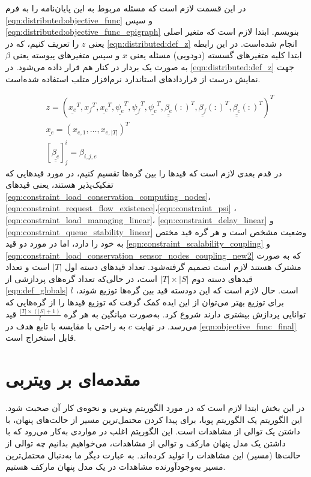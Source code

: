 	در این قسمت لازم است که مسئله مربوط به این پایان‌نامه را به فرم \cref{eqn:distributed:objective_func} و سپس \cref{eqn:distributed:objective_func_epigraph} بنویسم. ابتدا لازم است که متغیر اصلی یعنی $z$ را تعریف کنیم، که در \cref{eqn:distributed:def_z} انجام شده‌است. در این رابطه ابتدا کلیه متغیرهای گسسته (دودویی) مسئله یعنی $x$  و سپس متغیرهای پیوسته یعنی $\beta$ به صورت یک بردار در کنار هم قرار داده می‌شود. در \cref{eqn:distributed:def_z} جهت نمایش درست از قراردادهای استاندارد نرم‌افزار متلب استفاده شده‌است. 
	
\begin{subequations}\label{eqn:distributed:def_z}
	\begin{align}
		&z = (\underline{x_e}^T, \underline{x_f}^T, \underline{x_c}^T, 
		\underline{\psi_e}^T, \underline{\psi_f}^T, \underline{\psi_c}^T,
		\underline{\underline{\beta_{e}}}(:)^T, \underline{\underline{\beta_{f}}}(:)^T, \underline{\underline{\beta_{c}}}(:)^T)^T \\
		&\underline{x_e} = (x_{e,1}, \dots, x_{e,|T|})^T \\
		&[\underline{\underline{\beta_{e}}}]^i_j = \beta_{i,j,e}
	\end{align}
\end{subequations}
در قدم بعدی لازم است که قیدها را بین گره‌ها تقسیم کنیم، در مورد قیدهایی که تفکیک‌پذیر هستند، یعنی قیدهای \cref{eqn:constraint_load_conservation_computing_nodes}، \cref{eqn:constraint_request_flow_existence}،\cref{eqn:constraint_psi} ، \cref{eqn:constraint_load_managing_linear}، \cref{eqn:constraint_delay_linear} و \cref{eqn:constraint_queue_stability_linear} وضعیت مشخص است و هر گره قید مختص به خود را دارد، اما در مورد دو قید \cref{eqn:constraint_scalability_coupling} و \cref{eqn:constraint_load_conservation_sensor_nodes_coupling_new2} که به صورت مشترک هستند لازم است تصمیم گرفته‌شود. تعداد قیدهای دسته اول $|T|$ است و تعداد قیدهای دسته دوم $|T| \times |S|$ است، در حالی‌که تعداد گره‌های پردازشی از \cref{eqn:def_globals} $l$ است. حال لازم است که این دودسته قید بین گره‌ها توزیع شوند، برای توزیع بهتر می‌توان از این ایده کمک گرفت که توزیع قیدها را از گره‌هایی که توانایی پردازش بیشتری دارند شروع کرد. به‌صورت میانگین به هر گره $\frac{|T|\times(|S|+1)}{l}$ قید می‌رسد. در نهایت $c$ به راحتی با مقایسه با تابع هدف در \cref{eqn:objective_func_final} قابل استخراج است. 

\section{مقدمه‌ای بر ویتربی}
در این بخش ابتدا لازم است که در مورد الگوریتم ویتربی و نحوه‌ی کار آن صحبت شود. این الگوریتم یک الگوریتم پویا، برای پیدا کردن محتمل‌ترین مسیر از حالت‌های پنهان، با داشتن یک توالی از مشاهدات است. این الگوریتم اغلب در مواردی به‌کار می‌رود که با داشتن یک مدل پنهان مارکف و توالی‌ از مشاهدات، می‌خواهیم بدانیم چه توالی‌ از حالت‌ها (مسیر) این مشاهدات را تولید کرده‌اند. به عبارت دیگر ما به‌دنبال محتمل‌ترین مسیر به‌وجودآورنده مشاهدات در یک مدل پنهان مارکف هستیم. 

